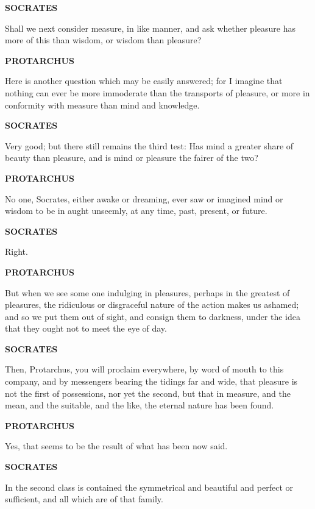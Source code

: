 \documentclass[11pt,letter]{article}
\begin{document}
\par \textbf{SOCRATES}
\par   Shall we next consider measure, in like manner, and ask whether pleasure has more of this than wisdom, or wisdom than pleasure?

\par \textbf{PROTARCHUS}
\par   Here is another question which may be easily answered; for I imagine that nothing can ever be more immoderate than the transports of pleasure, or more in conformity with measure than mind and knowledge.

\par \textbf{SOCRATES}
\par   Very good; but there still remains the third test:  Has mind a greater share of beauty than pleasure, and is mind or pleasure the fairer of the two?

\par \textbf{PROTARCHUS}
\par   No one, Socrates, either awake or dreaming, ever saw or imagined mind or wisdom to be in aught unseemly, at any time, past, present, or future.

\par \textbf{SOCRATES}
\par   Right.

\par \textbf{PROTARCHUS}
\par   But when we see some one indulging in pleasures, perhaps in the greatest of pleasures, the ridiculous or disgraceful nature of the action makes us ashamed; and so we put them out of sight, and consign them to darkness, under the idea that they ought not to meet the eye of day.

\par \textbf{SOCRATES}
\par   Then, Protarchus, you will proclaim everywhere, by word of mouth to this company, and by messengers bearing the tidings far and wide, that pleasure is not the first of possessions, nor yet the second, but that in measure, and the mean, and the suitable, and the like, the eternal nature has been found.

\par \textbf{PROTARCHUS}
\par   Yes, that seems to be the result of what has been now said.

\par \textbf{SOCRATES}
\par   In the second class is contained the symmetrical and beautiful and perfect or sufficient, and all which are of that family.
\end{document}
